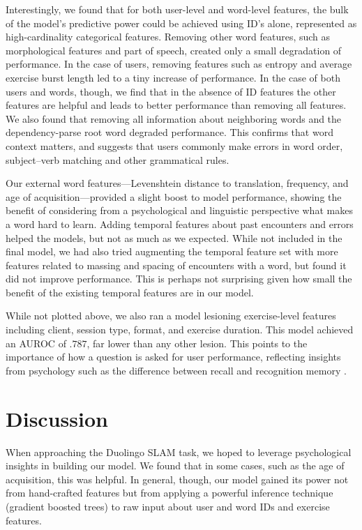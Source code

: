 \documentclass[11pt,a4paper]{article}
\begin{document}
Interestingly, we found that for both user-level and word-level features, the
bulk of the model's predictive power could be achieved using ID's alone,
represented as high-cardinality categorical features. Removing other word features,
such as morphological features and part of speech, created only a small
degradation of performance. In the case of users, removing features such as
entropy and average exercise burst length led to a tiny increase of performance.
In the case of both users and words, though, we find that in the absence of ID
features the other features are helpful and leads to better performance than
removing all features. We also found that removing all information about
neighboring words and the dependency-parse root word degraded performance. This
confirms that word context matters, and suggests that users commonly make errors in word order,
subject--verb matching and other grammatical rules.

Our external word features---Levenshtein distance to translation, frequency, and
age of acquisition---provided a slight boost to model performance, showing the
benefit of considering from a psychological and linguistic perspective what
makes a word hard to learn. Adding temporal features about past encounters and
errors helped the models, but not as much as we expected. While not included in
the final model, we had also tried augmenting the temporal feature set with more
features related to massing and spacing of encounters with a word, but found it
did not improve performance. This is perhaps not surprising given how small the
benefit of the existing temporal features are in our model.

While not plotted above, we also ran a model lesioning exercise-level features
including client, session type, format, and exercise duration. This model
achieved an AUROC of $.787$, far lower than any other lesion. This points to the
importance of how a question is asked for user performance, reflecting insights
from psychology such as the difference between recall and recognition memory
\cite{yonelinas2002nature}.

\section{Discussion}

When approaching the Duolingo SLAM task, we hoped to leverage psychological
insights in building our model. We found that in some cases, such as the
age of acquisition, this was helpful. In general, though, our model gained its
power not from hand-crafted features but from applying a powerful inference
technique (gradient boosted trees) to raw input about user and word IDs and
exercise features.
\end{document}
